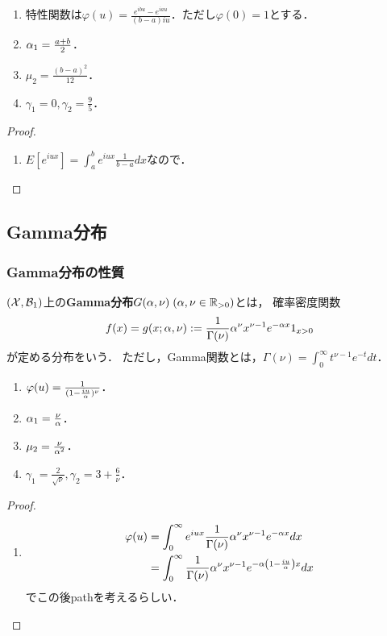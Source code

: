 \documentclass[uplatex,dvipdfmx]{jsreport}
\begin{document}
\begin{proposition}\mbox{}
    \begin{enumerate}
        \item 特性関数は$\varphi(u)=\frac{e^{ibu}-e^{iau}}{(b-a)iu}$．ただし$\varphi(0)=1$とする．
        \item $\alpha_1=\frac{a+b}{2}$．
        \item $\mu_2=\frac{(b-a)^2}{12}$．
        \item $\gamma_1=0,\gamma_2=\frac{9}{5}$．
    \end{enumerate}
\end{proposition}
\begin{proof}\mbox{}
    \begin{enumerate}
        \item $E[e^{iux}]=\int^b_ae^{iux}\frac{1}{b-a}dx$なので．
    \end{enumerate}
\end{proof}

\subsection{Gamma分布}

\subsubsection{Gamma分布の性質}

\begin{definition}
    $(\mathcal{X},\mathcal{B}_1)$上の\textbf{Gamma分布}$G(\alpha,\nu)\;(\alpha,\nu\in\mathbb{R}_{>0})$とは，
    確率密度関数
    \[f(x)=g(x;\alpha,\nu):=\frac{1}{\Gamma(\nu)}\alpha^\nu x^{\nu-1}e^{-\alpha x}1_{x>0}\]
    が定める分布をいう．
    ただし，Gamma関数とは，$\Gamma(\nu)=\int^\infty_0t^{\nu-1}e^{-t}dt$．
\end{definition}

\begin{proposition}\mbox{}
    \begin{enumerate}
        \item $\varphi(u)=\frac{1}{(1-\frac{iu}{\alpha})^\nu}$．
        \item $\alpha_1=\frac{\nu}{\alpha}$．
        \item $\mu_2=\frac{\nu}{\alpha^2}$．
        \item $\gamma_1=\frac{2}{\sqrt{\nu}},\gamma_2=3+\frac{6}{\nu}$．
    \end{enumerate}
\end{proposition}
\begin{proof}\mbox{}
    \begin{enumerate}
        \item \begin{align*}
            \varphi(u)&=\int^\infty_0e^{iux}\frac{1}{\Gamma(\nu)}\alpha^\nu x^{\nu-1}e^{-\alpha x}dx\\
            &=\int^\infty_0\frac{1}{\Gamma(\nu)}\alpha^\nu x^{\nu-1}e^{-\alpha\left(1-\frac{iu}{\alpha}\right)x}dx
        \end{align*}
        でこの後pathを考えるらしい．
    \end{enumerate}
\end{proof}
\end{document}
